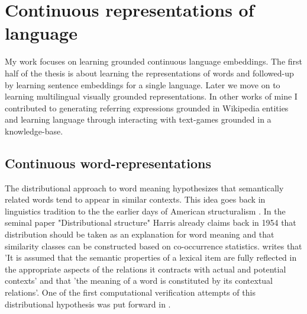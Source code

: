 \section{Continuous representations of language}
My work focuses on learning grounded continuous language embeddings. The first half of the thesis is about learning the representations of words and followed-up by learning sentence embeddings for a single language. Later we move on to learning multilingual visually grounded representations. In other works of mine I contributed to generating referring expressions grounded in Wikipedia entities and learning language through interacting with text-games grounded in a knowledge-base.

\subsection{Continuous word-representations}
The distributional approach to word meaning hypothesizes that semantically related words tend to appear in similar contexts. This idea goes back in linguistics tradition to the the earlier days of American structuralism \cite{nevin2002legacy}. In the seminal paper "Distributional structure" \cite{harris1954distributional} Harris already claims back in 1954 that distribution should be taken as an explanation for word meaning and that similarity classes can be constructed based on co-occurrence statistics. \cite{cruse1986lexical} writes that 'It is  assumed  that  the  semantic properties  of  a lexical  item  are  fully  reflected  in  the  appropriate  aspects  of  the  relations  it  contracts  with  actual  and  potential  contexts' and that 'the  meaning  of  a word  is constituted  by  its  contextual  relations'. One of the first computational verification attempts of  this distributional hypothesis was put forward in \cite{miller1991contextual}.
